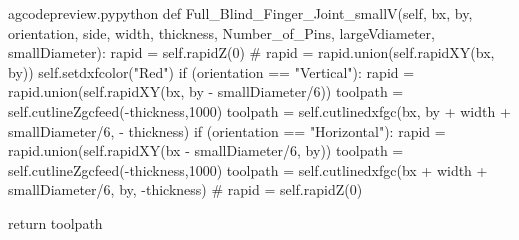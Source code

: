 \documentclass{ltxdoc}
\begin{document}
\begin{writecode}{a}{gcodepreview.py}{python}
    def Full_Blind_Finger_Joint_smallV(self, bx, by, orientation, side, width, thickness, Number_of_Pins, largeVdiameter, smallDiameter):
        rapid = self.rapidZ(0)
    #    rapid = rapid.union(self.rapidXY(bx, by))
        self.setdxfcolor("Red")
        if (orientation == "Vertical"):
            rapid = rapid.union(self.rapidXY(bx, by - smallDiameter/6))
            toolpath = self.cutlineZgcfeed(-thickness,1000)
            toolpath = self.cutlinedxfgc(bx, by + width + smallDiameter/6, - thickness)
        if (orientation == "Horizontal"):
            rapid = rapid.union(self.rapidXY(bx - smallDiameter/6, by))
            toolpath = self.cutlineZgcfeed(-thickness,1000)
            toolpath = self.cutlinedxfgc(bx + width + smallDiameter/6, by, -thickness)
    #        rapid = self.rapidZ(0)

        return toolpath


\end{writecode}
\end{document}
